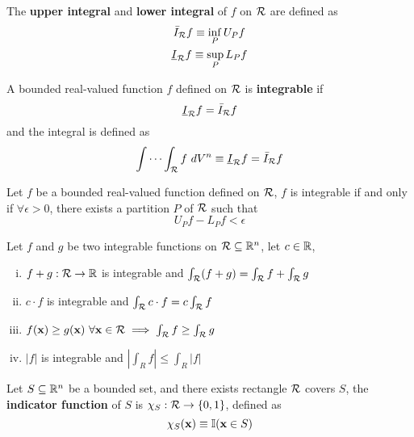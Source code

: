 \documentclass[11pt]{article}
\begin{document}
			\begin{definition}
				The \textbf{upper integral} and \textbf{lower integral} of $f$ on $\mathcal{{R}}$ are defined as
				\begin{gather}
					\bar{I}_{\mathcal{{R}}} f \equiv \inf_{P} U_P f \\
					\underline{I}_{\mathcal{{R}}} f \equiv \sup_{P} L_P f
				\end{gather}
			\end{definition}
			
			\begin{definition}
				A bounded real-valued function $f$ defined on $\mathcal{{R}}$ is \textbf{integrable} if
				\begin{equation}
					\underline{I}_{\mathcal{{R}}} f = \bar{I}_{\mathcal{{R}}} f
				\end{equation}
				and the integral is defined as
				\begin{equation}
					\int \cdots \int_{\mathcal{{R}}} f\ dV^n \equiv \underline{I}_{\mathcal{{R}}} f = \bar{I}_{\mathcal{{R}}} f
				\end{equation}
			\end{definition}
			
			\begin{lemma}
				Let $f$ be a bounded real-valued function defined on $\mathcal{{R}}$, $f$ is integrable if and only if $\forall \epsilon > 0$, there exists a partition $P$ of $\mathcal{{R}}$ such that
				\begin{equation}
					U_P f - L_P f < \epsilon
				\end{equation}
			\end{lemma}
			
			\begin{theorem}
				Let $f$ and $g$ be two integrable functions on $\mathcal{{R}} \subseteq \mathbb{R}^n$, let $c \in \mathbb{R}$, 
				\begin{enumerate}[(i)]
					\item $f+g:\mathcal{{R}} \to \mathbb{R}$ is integrable and $\int_{\mathcal{{R}}} (f+g) = \int_{\mathcal{{R}}} f + \int_{\mathcal{{R}}} g$
					\item $c \cdot f$ is integrable and $\int_{\mathcal{{R}}} c \cdot f = c \int_{\mathcal{{R}}} f$
					\item $f(\textbf{x}) \geq g(\textbf{x})\ \forall \textbf{x} \in \mathcal{{R}} \implies \int_{\mathcal{{R}}} f \geq \int_{\mathcal{{R}}} g$
					\item $|f|$ is integrable and $|\int_{R} f| \leq \int_{R} |f|$
				\end{enumerate}
			\end{theorem}
			
			\begin{definition}
				Let $S \subseteq \mathbb{R}^n$ be a bounded set, and there exists rectangle $\mathcal{{R}}$ covers $S$, the \textbf{indicator function} of $S$ is $\chi_S: \mathcal{{R}} \to \{0, 1\}$, defined as
				\begin{equation}
					\chi_S (\textbf{x}) \equiv \mathbb{I}(\textbf{x} \in S)
				\end{equation}
			\end{definition}
			
\end{document}

